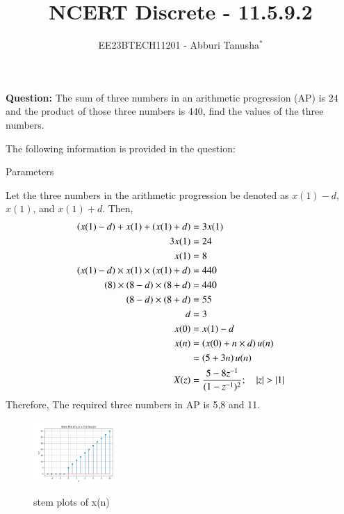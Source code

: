 \documentclass[journal,12pt,twocolumn]{IEEEtran}
\theoremstyle{remark}
\begin{document}

\vspace{3cm}

\title{NCERT Discrete - 11.5.9.2}
\author{EE23BTECH11201 - Abburi Tanusha$^{*}$%
}
\maketitle
\newpage
\bigskip

\renewcommand{\thefigure}{\theenumi}
\renewcommand{\thetable}{\theenumi}

\vspace{3cm}

\maketitle
\textbf{Question:} 
The sum of three numbers in an arithmetic progression (AP) is $24$ and the product of those three numbers is $440$, find the values of the three numbers.

\solution
The following information is provided in the question:
\begin{table}[h]
 	\centering
 	\resizebox{6 cm}{!}{
 		
 	}
 	\vspace{6 pt}
 	\caption{Parameters}
 	\label{tab:my_label} 
 \end{table}
\newline
Let the three numbers in the arithmetic progression be denoted as $x(1) - d$, $x(1)$, and $x(1) + d$. Then,
\begin{align}
    \left(x(1)-d\right) + x(1) + \left(x(1) + d\right) &= 3x(1) \\
     3x(1) &= 24 \\
    x(1) &= 8 \\
    \label{eq:eq3} 
    \left(x(1) - d\right) \times x(1) \times \left(x(1) + d\right) &= 440 \\
    \left(8\right) \times \left(8-d\right) \times \left(8+d\right) &= 440 \\
    \left(8-d\right) \times \left(8+d\right) &= 55 \\
    d &= 3 \\
    x(0) &= x(1)-d\\
    x(n) &= \left(x(0) + n \times d\right) u(n) \\
         &= \left(5 + 3n\right)u(n)\\
    X(z) &= \frac{5 - 8z^{-1}}{(1-z^{-1})^2} ; \quad \left\vert z\right\vert>\left\vert1\right\vert
\end{align}
Therefore, The required three numbers in AP is 5,8 and 11.
\begin{figure}[h!]
  \centering
  \includegraphics[width=0.3\textwidth]{figs/stem_plot.png} 
  \label{fig:1}
  \caption{stem plots of x(n)}
\end{figure}
\end{document}
